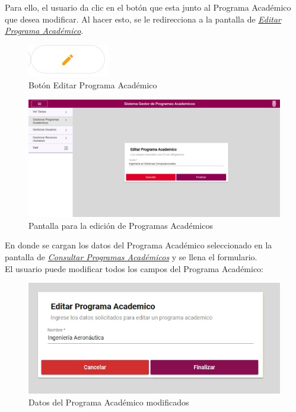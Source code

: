             Para ello, el usuario da clic en el botón \BtnLapiz que esta junto al Programa Académico que desea modificar. Al hacer esto, se le redirecciona a la pantalla de \hyperlink{editarpa}{\textit{Editar Programa Académico}}.
            \begin{figure}[H]
                \centering
                \hypertarget{editar}{\includegraphics[width=0.7\linewidth]{images/SP3/BtnEditar}}
                \caption{Botón Editar Programa Académico}
                \label{editar}
            \end{figure}
        \begin{figure}[H]
            \centering
            \hypertarget{editarpa}{\includegraphics[width=0.7\linewidth]{images/SP3/EditarPA}}
            \caption{Pantalla para la edición de Programas Académicos}
            \label{editarpa}
        \end{figure}

        En donde se cargan los datos del Programa Académico seleccionado en la pantalla de \hyperlink{consultarpa}{\textit{Consultar Programas Académicos}} y se llena el formulario.\\

        El usuario puede modificar todos los campos del Programa Académico:
        \begin{figure}[H]
            \centering
            \hypertarget{modif}{\includegraphics[width=0.7\linewidth]{images/SP3/Editado}}
            \caption{Datos del Programa Académico modificados}
            \label{modif}
        \end{figure}

